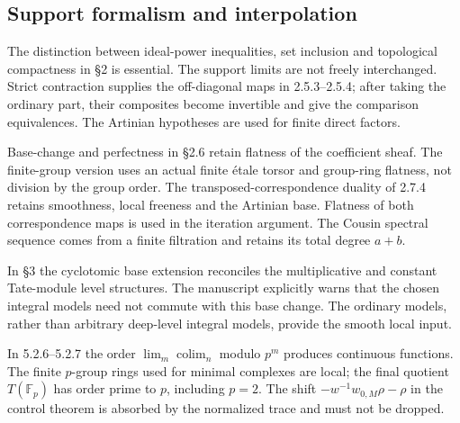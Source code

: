 \documentclass[10pt]{article}
\begin{document}
\subsection*{Support formalism and interpolation}
The distinction between ideal-power inequalities, set inclusion and topological compactness in §2 is essential. The support limits are not freely interchanged. Strict contraction supplies the off-diagonal maps in 2.5.3–2.5.4; after taking the ordinary part, their composites become invertible and give the comparison equivalences. The Artinian hypotheses are used for finite direct factors.\par
Base-change and perfectness in §2.6 retain flatness of the coefficient sheaf. The finite-group version uses an actual finite étale torsor and group-ring flatness, not division by the group order. The transposed-correspondence duality of 2.7.4 retains smoothness, local freeness and the Artinian base. Flatness of both correspondence maps is used in the iteration argument. The Cousin spectral sequence comes from a finite filtration and retains its total degree \(a+b\).\par
In §3 the cyclotomic base extension reconciles the multiplicative and constant Tate-module level structures. The manuscript explicitly warns that the chosen integral models need not commute with this base change. The ordinary models, rather than arbitrary deep-level integral models, provide the smooth local input.\par
In 5.2.6–5.2.7 the order \(\lim_m\operatorname{colim}_n\) modulo \(p^m\) produces continuous functions. The finite \(p\)-group rings used for minimal complexes are local; the final quotient \(T(\mathbb F_p)\) has order prime to \(p\), including \(p=2\). The shift \(-w^{-1}w_{0,M}\rho-\rho\) in the control theorem is absorbed by the normalized trace and must not be dropped.\par
\end{document}
